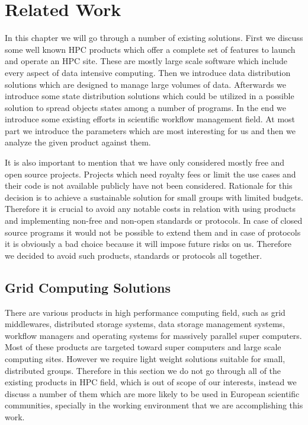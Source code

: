 \chapter{Related Work}
\label{cha:literature}

In this chapter we will go through a number of existing solutions. First we discuss some well known
HPC products which offer a complete set of features to launch and operate an HPC site. These are
mostly large scale software which include every aspect of data intensive computing. 
Then we introduce data distribution solutions which are designed to manage large volumes of data. 
Afterwards we introduce some state distribution solutions which could be utilized in a possible solution to
spread objects states among a number of programs. 
In the end we introduce some existing efforts
in scientific workflow management field. 
At most part we introduce the parameters which are
most interesting for us and then we analyze the given product against them.

It is also important to mention that we have only considered mostly free and open source projects. 
Projects which need royalty fees or limit the use cases and their code is not available
publicly have not been considered. Rationale for this decision is to achieve a 
sustainable solution for small groups with limited budgets. Therefore it is crucial to avoid
any notable costs in relation with using products and implementing non-free and non-open standards or protocols.
In case of closed source programs it would not be possible to extend them and in case of protocols it is
obviously a bad choice because it will impose future risks on us. 
Therefore we decided to avoid such products, standards or protocols all together.


\section{Grid Computing Solutions}
There are various products in high performance computing field, such as grid middlewares, distributed
storage systems, data storage management systems, workflow managers and operating systems for massively parallel 
super computers. 
Most of these products are targeted toward super computers and large scale
computing sites. 
However we require light weight solutions suitable for small, distributed groups. 
Therefore in this section we do not go through
all of the existing products in HPC field, which is out of scope of our interests, 
instead we discuss a number of them
which are more likely to be used in European scientific communities, specially in the working 
environment that we are accomplishing this work.

